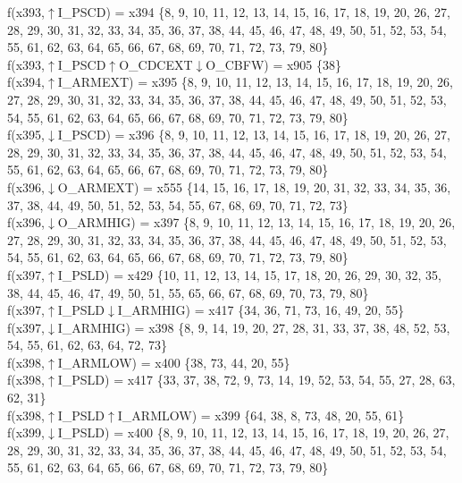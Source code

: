f(x393,$\uparrow$I\_PSCD) = x394 \{8, 9, 10, 11, 12, 13, 14, 15, 16, 17, 18, 19, 20, 26, 27, 28, 29, 30, 31, 32, 33, 34, 35, 36, 37, 38, 44, 45, 46, 47, 48, 49, 50, 51, 52, 53, 54, 55, 61, 62, 63, 64, 65, 66, 67, 68, 69, 70, 71, 72, 73, 79, 80\} \\  
f(x393,$\uparrow$I\_PSCD$\uparrow$O\_CDCEXT$\downarrow$O\_CBFW) = x905 \{38\} \\  
f(x394,$\uparrow$I\_ARMEXT) = x395 \{8, 9, 10, 11, 12, 13, 14, 15, 16, 17, 18, 19, 20, 26, 27, 28, 29, 30, 31, 32, 33, 34, 35, 36, 37, 38, 44, 45, 46, 47, 48, 49, 50, 51, 52, 53, 54, 55, 61, 62, 63, 64, 65, 66, 67, 68, 69, 70, 71, 72, 73, 79, 80\} \\  
f(x395,$\downarrow$I\_PSCD) = x396 \{8, 9, 10, 11, 12, 13, 14, 15, 16, 17, 18, 19, 20, 26, 27, 28, 29, 30, 31, 32, 33, 34, 35, 36, 37, 38, 44, 45, 46, 47, 48, 49, 50, 51, 52, 53, 54, 55, 61, 62, 63, 64, 65, 66, 67, 68, 69, 70, 71, 72, 73, 79, 80\} \\  
f(x396,$\downarrow$O\_ARMEXT) = x555 \{14, 15, 16, 17, 18, 19, 20, 31, 32, 33, 34, 35, 36, 37, 38, 44, 49, 50, 51, 52, 53, 54, 55, 67, 68, 69, 70, 71, 72, 73\} \\  
f(x396,$\downarrow$O\_ARMHIG) = x397 \{8, 9, 10, 11, 12, 13, 14, 15, 16, 17, 18, 19, 20, 26, 27, 28, 29, 30, 31, 32, 33, 34, 35, 36, 37, 38, 44, 45, 46, 47, 48, 49, 50, 51, 52, 53, 54, 55, 61, 62, 63, 64, 65, 66, 67, 68, 69, 70, 71, 72, 73, 79, 80\} \\  
f(x397,$\uparrow$I\_PSLD) = x429 \{10, 11, 12, 13, 14, 15, 17, 18, 20, 26, 29, 30, 32, 35, 38, 44, 45, 46, 47, 49, 50, 51, 55, 65, 66, 67, 68, 69, 70, 73, 79, 80\} \\  
f(x397,$\uparrow$I\_PSLD$\downarrow$I\_ARMHIG) = x417 \{34, 36, 71, 73, 16, 49, 20, 55\} \\  
f(x397,$\downarrow$I\_ARMHIG) = x398 \{8, 9, 14, 19, 20, 27, 28, 31, 33, 37, 38, 48, 52, 53, 54, 55, 61, 62, 63, 64, 72, 73\} \\  
f(x398,$\uparrow$I\_ARMLOW) = x400 \{38, 73, 44, 20, 55\} \\  
f(x398,$\uparrow$I\_PSLD) = x417 \{33, 37, 38, 72, 9, 73, 14, 19, 52, 53, 54, 55, 27, 28, 63, 62, 31\} \\  
f(x398,$\uparrow$I\_PSLD$\uparrow$I\_ARMLOW) = x399 \{64, 38, 8, 73, 48, 20, 55, 61\} \\  
f(x399,$\downarrow$I\_PSLD) = x400 \{8, 9, 10, 11, 12, 13, 14, 15, 16, 17, 18, 19, 20, 26, 27, 28, 29, 30, 31, 32, 33, 34, 35, 36, 37, 38, 44, 45, 46, 47, 48, 49, 50, 51, 52, 53, 54, 55, 61, 62, 63, 64, 65, 66, 67, 68, 69, 70, 71, 72, 73, 79, 80\} \\  
